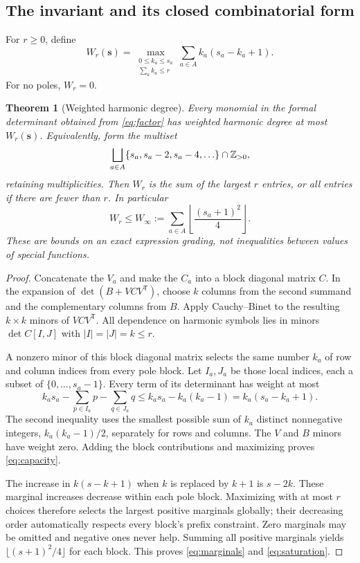 \documentclass[11pt,letterpaper]{article}
\numberwithin{equation}{section}
\newtheorem{theorem}{Theorem}[section]
\theoremstyle{definition}\newtheorem{definition}[theorem]{Definition}
\theoremstyle{remark}\newtheorem{remark}[theorem]{Remark}
\begin{document}
\subsection{The invariant and its closed combinatorial form}

For $r\ge0$, define
\begin{equation}\label{eq:capacity}
 W_r(\mathbf s)=
 \max_{\substack{0\le k_a\le s_a\\\sum_a k_a\le r}}
                 \sum_{a\in A}k_a(s_a-k_a+1).
\end{equation}
For no poles, $W_r=0$.

\begin{theorem}[Weighted harmonic degree]\label{thm:weight}
Every monomial in the formal determinant obtained from
\eqref{eq:factor} has weighted harmonic degree at most
$W_r(\mathbf s)$. Equivalently, form the multiset
\begin{equation}\label{eq:marginals}
 \bigsqcup_{a\in A}\{s_a,s_a-2,s_a-4,\ldots\}\cap\mathbb Z_{>0},
\end{equation}
retaining multiplicities. Then $W_r$ is the sum of the largest $r$
entries, or all entries if there are fewer than $r$. In particular
\begin{equation}\label{eq:saturation}
 W_r\le W_\infty:=\sum_{a\in A}
                           \left\lfloor\frac{(s_a+1)^2}{4}\right\rfloor.
\end{equation}
These are bounds on an exact expression grading, not inequalities
between values of special functions.
\end{theorem}
\begin{proof}
Concatenate the $V_a$ and make the $C_a$ into a block diagonal matrix
$C$. In the expansion of $\det(B+VCV^{\mathsf T})$, choose $k$ columns
from the second summand and the complementary columns from $B$.
Apply Cauchy--Binet to the resulting $k\times k$ minors of
$VCV^{\mathsf T}$. All dependence on harmonic symbols lies in minors
$\det C[I,J]$ with $|I|=|J|=k\le r$.

A nonzero minor of this block diagonal matrix selects the same number
$k_a$ of row and column indices from every pole block. Let $I_a,J_a$
be those local indices, each a subset of $\{0,\ldots,s_a-1\}$.
Every term of its determinant has weight at most
\[
 k_a s_a-\sum_{p\in I_a}p-\sum_{q\in J_a}q
 \le k_a s_a-k_a(k_a-1)=k_a(s_a-k_a+1).
\]
The second inequality uses the smallest possible sum of $k_a$ distinct
nonnegative integers, $k_a(k_a-1)/2$, separately for rows and columns.
The $V$ and $B$ minors have weight zero. Adding the block contributions
and maximizing proves \eqref{eq:capacity}.

The increase in $k(s-k+1)$ when $k$ is replaced by $k+1$ is $s-2k$.
These marginal increases decrease within each pole block. Maximizing
with at most $r$ choices therefore selects the largest positive
marginals globally; their decreasing order automatically respects every
block's prefix constraint. Zero marginals may be omitted and negative
ones never help. Summing all positive marginals yields
$\lfloor(s+1)^2/4\rfloor$ for each block. This proves
\eqref{eq:marginals} and \eqref{eq:saturation}.
\end{proof}
\end{document}
